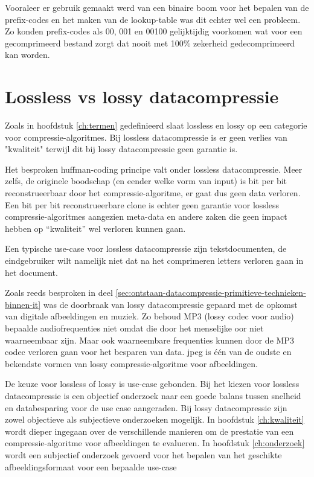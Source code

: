 Vooraleer er gebruik gemaakt werd van een binaire boom voor het bepalen van de \glspl{prefix-code} en het maken van de \gls{lookup-table} was dit echter wel een probleem. Zo konden \glspl{prefix-code} als 00, 001 en 00100 gelijktijdig voorkomen wat voor een gecomprimeerd bestand zorgt dat nooit met 100\% zekerheid gedecomprimeerd kan worden.

\section{Lossless vs lossy datacompressie}
\label{sec:ontstaan-datacompressie-lossless-lossy}
Zoals in hoofdstuk \ref{ch:termen} gedefinieerd slaat \gls{lossless} en \gls{lossy} op een categorie voor \glspl{compressie-algoritme}.
Bij \gls{lossless} \gls{datacompressie} is er geen verlies van "kwaliteit" terwijl dit bij \gls{lossy} \gls{datacompressie} geen garantie is.

Het besproken \gls{huffman-coding} principe valt onder \gls{lossless} \gls{datacompressie}. Meer zelfs, de originele boodschap (en eender welke vorm van input) is bit per bit reconstrueerbaar door het \gls{compressie-algoritme}, er gaat dus geen data verloren. Een bit per bit reconstrueerbare clone is echter geen garantie voor \gls{lossless} \glspl{compressie-algoritme} aangezien \gls{meta-data} en andere zaken die geen impact hebben op “kwaliteit” wel verloren kunnen gaan.

Een typische \gls{use-case} voor \gls{lossless} \gls{datacompressie} zijn tekstdocumenten, de eindgebruiker wilt namelijk niet dat na het comprimeren letters verloren gaan in het document. 

Zoals reeds besproken in deel \ref{sec:ontstaan-datacompressie-primitieve-technieken-binnen-it} was de doorbraak van  \gls{lossy} \gls{datacompressie} gepaard met de opkomst van digitale afbeeldingen en muziek. Zo behoud MP3 (\gls{lossy} \gls{codec} voor audio) bepaalde audiofrequenties niet omdat die door het menselijke oor niet waarneembaar zijn. Maar ook waarneembare frequenties kunnen door de MP3 \gls{codec} verloren gaan voor het besparen van data. \gls{jpeg} is één van de oudste en bekendste vormen van \gls{lossy} \gls{compressie-algoritme} voor afbeeldingen. 

De keuze voor \gls{lossless} of \gls{lossy} is \gls{use-case} gebonden. Bij het kiezen voor \gls{lossless} \gls{datacompressie} is een objectief onderzoek naar een goede balans tussen snelheid en databesparing voor de use case aangeraden. Bij \gls{lossy} \gls{datacompressie} zijn zowel objectieve als subjectieve onderzoeken mogelijk. In hoofdstuk \ref{ch:kwaliteit} wordt dieper ingegaan over de verschillende manieren om de prestatie van een \gls{compressie-algoritme} voor afbeeldingen te evalueren. In hoofdstuk \ref{ch:onderzoek} wordt een subjectief onderzoek gevoerd voor het bepalen van het geschikte \gls{afbeeldingsformaat} voor een bepaalde \gls{use-case}

